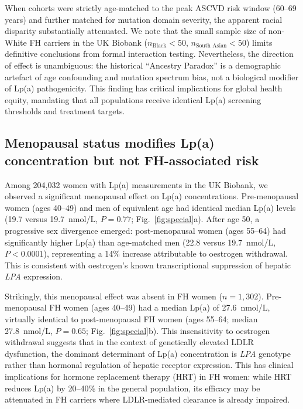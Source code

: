 \documentclass[11pt,a4paper]{article}
\newcommand{\lpa}{Lp(a)}
\newcommand{\ukb}{UK Biobank}
\begin{document}
When cohorts were strictly age-matched to the peak ASCVD risk window (60--69 years) and further matched for mutation domain severity, the apparent racial disparity substantially attenuated. We note that the small sample size of non-White FH carriers in the \ukb{} ($n_{\text{Black}} < 50$, $n_{\text{South Asian}} < 50$) limits definitive conclusions from formal interaction testing. Nevertheless, the direction of effect is unambiguous: the historical ``Ancestry Paradox'' is a demographic artefact of age confounding and mutation spectrum bias, not a biological modifier of \lpa{} pathogenicity. This finding has critical implications for global health equity, mandating that all populations receive identical \lpa{} screening thresholds and treatment targets.

\subsection*{Menopausal status modifies \lpa{} concentration but not FH-associated risk}

Among 204{,}032 women with \lpa{} measurements in the \ukb{}, we observed a significant menopausal effect on \lpa{} concentrations. Pre-menopausal women (ages 40--49) and men of equivalent age had identical median \lpa{} levels (19.7 versus 19.7~nmol/L, $P = 0.77$; Fig.~\ref{fig:special}a). After age 50, a progressive sex divergence emerged: post-menopausal women (ages 55--64) had significantly higher \lpa{} than age-matched men (22.8 versus 19.7~nmol/L, $P < 0.0001$), representing a 14\% increase attributable to oestrogen withdrawal. This is consistent with oestrogen's known transcriptional suppression of hepatic \textit{LPA} expression\cite{suk2006}.

Strikingly, this menopausal effect was absent in FH women ($n = 1{,}302$). Pre-menopausal FH women (ages 40--49) had a median \lpa{} of 27.6~nmol/L, virtually identical to post-menopausal FH women (ages 55--64; median 27.8~nmol/L, $P = 0.65$; Fig.~\ref{fig:special}b). This insensitivity to oestrogen withdrawal suggests that in the context of genetically elevated LDLR dysfunction, the dominant determinant of \lpa{} concentration is \textit{LPA} genotype rather than hormonal regulation of hepatic receptor expression. This has clinical implications for hormone replacement therapy (HRT) in FH women: while HRT reduces \lpa{} by 20--40\% in the general population\cite{suk2006}, its efficacy may be attenuated in FH carriers where LDLR-mediated clearance is already impaired.
\end{document}
